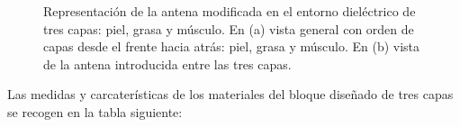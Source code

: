 \begin{figure}[!htb]
    \centering
    \caption{Representación de la antena modificada en el entorno dieléctrico de tres capas: piel, grasa y músculo. En (a) vista general con orden de capas desde el frente hacia atrás: piel, grasa y músculo. En (b) vista de la antena introducida entre las tres capas.}
    \label{fig:fig5.31}
\end{figure}


Las medidas y carcaterísticas de los materiales del bloque diseñado de tres capas se recogen en la tabla siguiente:


